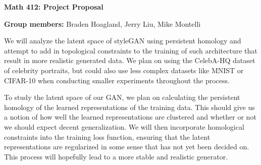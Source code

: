 \documentclass[10pt]{article}
\begin{document}
\pagestyle{empty}

\begin{center}
	\textbf{Math 412: Project Proposal} 
\end{center}

\vspace{5mm}

\noindent\textbf{Group members:} Braden Hoagland, Jerry Liu, Mike Montelli

\vspace{5mm}

We will analyze the latent space of styleGAN using persistent homology and attempt to add in topological constraints to the training of such architecture that result in more realistic generated data. We plan on using the CelebA-HQ dataset of celebrity portraits, but could also use less complex datasets like MNIST or CIFAR-10 when conducting smaller experiments throughout the process.

To study the latent space of our GAN, we plan on calculating the persistent homology of the learned representations of the training data. This should give us a notion of how well the learned representations are clustered and whether or not we should expect decent generalization. We will then incorporate homological constraints into the training loss function, ensuring that the latent representations are regularized in some sense that has not yet been decided on. This process will hopefully lead to a more stable and realistic generator.
\end{document}
